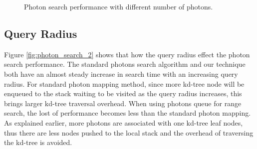 \begin{figure}[ftp]
    \centering
    \renewcommand{\thefigure}{\thechapter.\arabic{figure}}
    \caption[Photon search performance with different number of photons]{Photon search performance with different number of photons. }
    \label{fig:photon_search_1}
\end{figure}

\subsection{Query Radius}

Figure \ref{fig:photon_search_2} shows that how the query radius effect the photon search performance. The standard photons search algorithm and our technique both have an almost steady increase in search time with an increasing query radius. For standard photon mapping method, since more kd-tree node will be enqueued to the stack waiting to be visited as the query radius increases, this brings larger kd-tree traversal overhead. When using photons queue for range search, the lost of performance becomes less than the standard photon mapping. As explained earlier, more photons are associated with one kd-tree leaf nodes, thus there are less nodes pushed to the local stack and the overhead of traversing the kd-tree is avoided.

